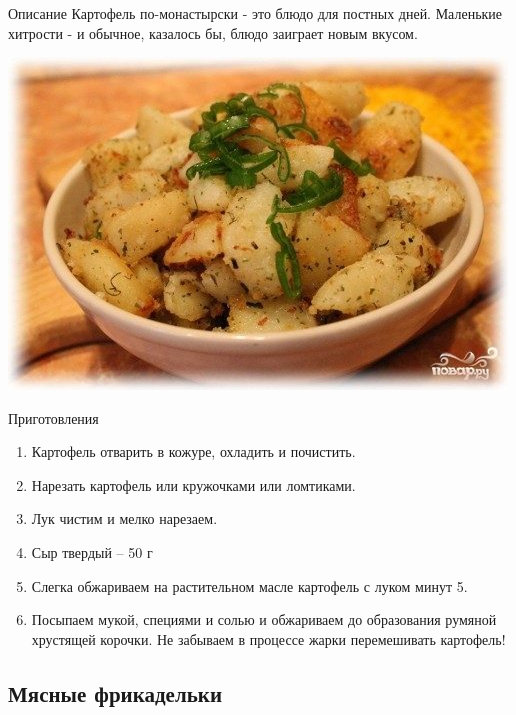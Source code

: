 \documentclass[t,hyperref={pdftex,unicode}]{beamer}  %
\begin{document}
\begin{frame}[allowframebreaks]
	\frametitle{\insertsection}
	\framesubtitle{\insertsubsection}
	
	\begin{block}{Описание}
	Картофель по-монастырски - это блюдо для постных дней. Маленькие хитрости - и обычное, казалось бы, блюдо заиграет новым вкусом.
	\begin{center}
		\includegraphics[scale=0.3]{6_2.jpg}
	\end{center}
	\end{block}
	
	\framebreak
		
	\begin{block}{Приготовления}
	\begin{enumerate}
		\item Картофель отварить в кожуре, охладить и почистить.
		\item Нарезать картофель или кружочками или ломтиками.
		\item Лук чистим и мелко нарезаем.
		\item Сыр твердый – 50 г
		\item Слегка обжариваем на растительном масле картофель с луком минут 5.
		\item  Посыпаем мукой, специями и солью и обжариваем до образования румяной хрустящей корочки. Не забываем в процессе жарки перемешивать картофель! 
	\end{enumerate}
	\end{block}
	
\end{frame}

\subsection{Мясные фрикадельки}
\end{document}
